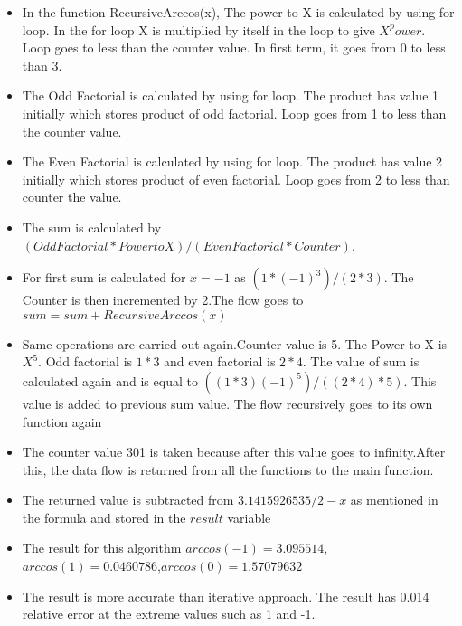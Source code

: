 \documentclass[12pt]{article}
\begin{document}
\begin{itemize}
    \item In the function RecursiveArccos(x), The power to X is calculated by using for loop. In the for loop X is multiplied by itself in the loop to give $X^power$. Loop goes to less than the counter value. In first term, it goes from 0 to less than 3.
    \item The Odd Factorial is calculated by using for loop. The product has value 1 initially which stores product of odd factorial. Loop goes from 1 to less than the counter value.
    \item The Even Factorial is calculated by using for loop. The product has value 2 initially which stores product of even factorial. Loop goes from 2 to less than counter the value.
    \item The sum is calculated by $(Odd Factorial*Power to X)/(Even Factorial * Counter)$.
    \item For first sum is calculated for $x=-1$ as $(1*(-1)^3)/(2*3)$. The Counter is then incremented by 2.The flow goes to $sum = sum+RecursiveArccos(x)$ 
    \item Same operations are carried out again.Counter value is 5. The Power to X is $X^5$. Odd factorial is $1*3$ and even factorial is $2*4$. The value of sum is calculated again and is equal to $((1*3)(-1)^5)/((2*4)*5)$. This value is added to previous sum value. The flow recursively goes to its own function again
    \item The counter value 301 is taken because after this value goes to infinity.After this, the data flow is returned from all the functions to the main function.
    \item The returned value is subtracted from $3.1415926535/2- x$ as mentioned in the formula and stored in the $result$ variable
    \item The result for this algorithm $arccos(-1)=3.095514$, $arccos(1)=0.0460786$,$arccos(0)=1.57079632$
    \item The result is more accurate than iterative approach. The result has 0.014 relative error at the extreme values such as 1 and -1.  
\end{itemize}
\end{document}
